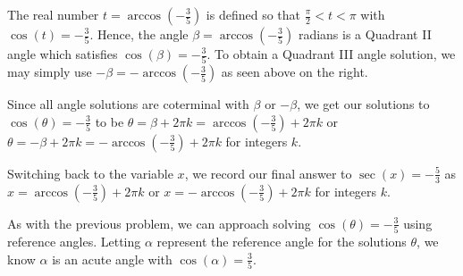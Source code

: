 \documentclass{ximera}
\begin{document}
\begin{example}
\begin{explanation}
\begin{enumerate}
\begin{image}
\end{image}


The real number $t = \arccos\left(-\frac{3}{5}\right)$ is defined so that $\frac{\pi}{2} < t < \pi$ with $\cos(t) = -\frac{3}{5}$.  Hence, the angle $\beta = \arccos\left(-\frac{3}{5}\right)$ radians is a Quadrant II angle which satisfies $\cos(\beta) = -\frac{3}{5}$. To obtain a Quadrant III angle solution, we may simply use $-\beta = -\arccos\left(-\frac{3}{5}\right)$ as seen above on the right.

 

Since all angle solutions are coterminal with $\beta$ or $-\beta$, we get our solutions to $\cos(\theta) = -\frac{3}{5}$ to be $\theta = \beta + 2\pi k = \arccos\left(-\frac{3}{5}\right) + 2\pi k$ or $\theta = -\beta + 2\pi k = -\arccos\left(-\frac{3}{5}\right) + 2\pi k$ for integers $k$.  

 

Switching back to the variable $x$,  we record our final answer to $\sec(x) = -\frac{5}{3}$ as $x = \arccos\left(-\frac{3}{5}\right) + 2\pi k$ or $x = -\arccos\left(-\frac{3}{5}\right) + 2\pi k$ for integers $k$.


 

As with the previous problem, we can approach solving  $\cos(\theta) = -\frac{3}{5}$ using reference angles.  Letting $\alpha$ represent the reference angle for the solutions $\theta$, we know $\alpha$ is an acute angle with $\cos(\alpha) = \frac{3}{5}$.


\end{enumerate}
\end{explanation}
\end{example}
\end{document}
